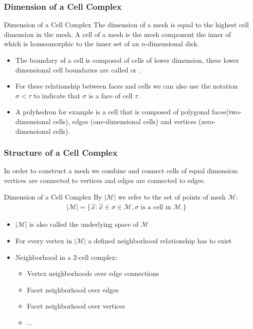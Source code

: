 \begin{frame}
  \frametitle{Dimension of a Cell Complex}
 	\begin{block}{Dimension of a Cell Complex}
	The dimension of a mesh is equal to the highest cell dimension in the mesh.
   A cell of a mesh is the mesh component the inner of which is homeomorphic to the inner set of an $n$-dimensional disk.  
	\end{block}
  \begin{itemize}
		\item The boundary of a cell is composed of cells of lower dimension, these lower dimensional cell boundaries are
 called  or .
		\item For these relationship between faces and cells we can also use the notation $\sigma < \tau$ to indicate that $\sigma$ is a face of cell $\tau$.
		\item A polyhedron for example is a cell that is composed of polygonal faces(two-dimensional cells), edges (one-dimensional cells) and vertices (zero-dimensional cells).
  \end{itemize}	
\end{frame}

\begin{frame}
  \frametitle{Structure of a Cell Complex}
In order to construct a mesh we combine and connect cells of equal dimension: vertices are connected to vertices and edges are connected to  edges. 
 	\begin{block}{Dimension of a Cell Complex}
By $|\mathcal M|$ we refer to the set of points of mesh $\mathcal M$:	
\begin{align*}
  |\mathcal M|=\{\vec{x} : \vec{x} \in \sigma \in \mathcal M, \text{$\sigma$ is a cell in $\mathcal M$.}\}  
\end{align*}
	\end{block}
  \begin{itemize}
		\item $|\mathcal M|$ is also called the underlying space of $\mathcal M$
		\item For every vertex in $|\mathcal M|$ a defined neighborhood relationship has to exist
		\item Neighborhood in a 2-cell complex:
		\begin{itemize}
			\item Vertex neighborhoods over edge connections
			\item Facet neighborhood over edges			
			\item Facet neighborhood over vertices
			\item ...									
		\end{itemize}				
  \end{itemize}		
\end{frame}


